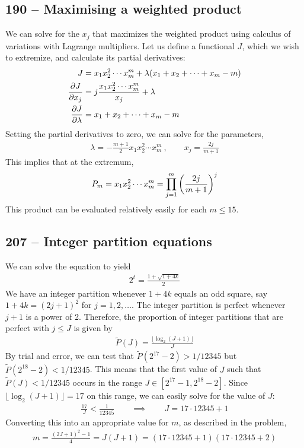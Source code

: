 \documentclass{article}
\begin{document}
\subsection*{190 -- Maximising a weighted product}
We can solve for the $x_j$ that maximizes the weighted product using calculus of variations with Lagrange multipliers.
Let us define a functional $J$, which we wish to extremize, and calculate its partial derivatives:
\begin{align*}
	J &= x_1 x_2^2 \cdots x_m^m + \lambda(x_1 + x_2 + \cdots + x_m - m) \\
	\pdv{J}{x_j} &= j \frac{x_1 x_2^2 \cdots x_m^m}{x_j} + \lambda \\
	\pdv{J}{\lambda} &= 	x_1 + x_2 + \cdots + x_m - m
\end{align*}
Setting the partial derivatives to zero, we can solve for the parameters,
\begin{align*}
	\lambda = -\frac{m+1}{2} x_1 x_2^2 \cdots x_m^m ~, \qquad x_j = \frac{2j}{m+1}
\end{align*}
This implies that at the extremum,
\begin{align*}
	P_m = x_1 x_2^2 \cdots x_m^m = \prod_{j=1}^m \qty( \frac{2j}{m+1} )^j
\end{align*}
This product can be evaluated relatively easily for each $m \leq 15$.


\subsection*{207 -- Integer partition equations}
We can solve the equation to yield
\begin{align*}
	2^t = \frac{1 + \sqrt{1+4k}}{2}
\end{align*}
We have an integer partition whenever $1+4k$ equals an odd square, say $1 + 4k = (2j+1)^2$ for $j = 1, 2, \dotsc$.
The integer partition is perfect whenever $j+1$ is a power of 2.
Therefore, the proportion of integer partitions that are perfect with $j \leq J$ is given by
\begin{align*}
	\tilde P(J) = \frac{ \lfloor \log_2 (J+1) \rfloor }{J}
\end{align*}
By trial and error, we can test that $\tilde P(2^{17} - 2) > 1/12345$ but $\tilde P(2^{18} - 2) < 1/12345$.
This means that the first value of $J$ such that $\tilde P(J) < 1/12345$ occurs in the range $J \in [2^{17}-1, 2^{18} - 2]$.
Since $\lfloor \log_2 (J+1) \rfloor = 17$ on this range, we can easily solve for the value of $J$:
\begin{align*}
	\frac{17}{J} < \frac{1}{12345} \qquad \implies\qquad J = 17 \cdot 12345 + 1
\end{align*}
Converting this into an appropriate value for $m$, as described in the problem,
\begin{align*}
	m = \frac{(2J + 1)^2 - 1}{4} = J(J+1) = \boxed{(17 \cdot 12345 + 1)(17 \cdot 12345 + 2)}
\end{align*}
\end{document}
